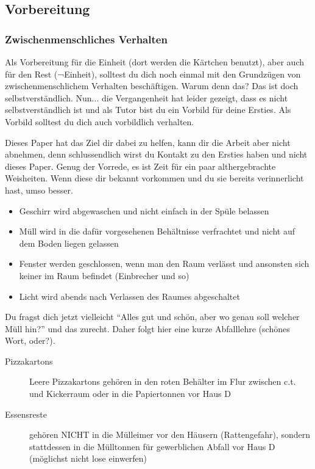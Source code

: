 \documentclass[a4paper,11pt]{scrartcl} %
\newenvironment{myitemize}{\begin{itemize}\itemsep -2pt}{\end{itemize}} %
\begin{document}
  \subsection{Vorbereitung} %
\subsubsection*{Zwischenmenschliches Verhalten}

Als Vorbereitung für die Einheit (dort werden die Kärtchen benutzt), aber auch für den Rest (¬Einheit), solltest du dich noch einmal mit den Grundzügen von zwischenmenschlichem Verhalten beschäftigen. Warum denn das? Das ist doch selbstverständlich.
Nun... die Vergangenheit hat leider gezeigt, dass es nicht selbstverständlich ist und als Tutor bist du ein Vorbild für deine Ersties. Als Vorbild solltest du dich auch vorbildlich verhalten.

Dieses Paper hat das Ziel dir dabei zu helfen, kann dir die Arbeit aber nicht abnehmen, denn schlussendlich wirst du Kontakt zu den Ersties haben und nicht dieses Paper. Genug der Vorrede, es ist Zeit für ein paar althergebrachte Weisheiten. Wenn diese dir bekannt vorkommen und du sie bereits verinnerlicht hast, umso besser.

\begin{myitemize}
	\item Geschirr wird abgewaschen und nicht einfach in der Spüle belassen
	\item Müll wird in die dafür vorgesehenen Behältnisse verfrachtet und nicht auf dem Boden liegen gelassen
	\item Fenster werden geschlossen, wenn man den Raum verlässt und ansonsten sich keiner im Raum befindet (Einbrecher und so)
	\item Licht wird abends nach Verlassen des Raumes abgeschaltet
\end{myitemize}

Du fragst dich jetzt vielleicht "`Alles gut und schön, aber wo genau soll welcher Müll hin?"' und das zurecht. Daher folgt hier eine kurze Abfalllehre (schönes Wort, oder?).

\begin{description}
	\item[Pizzakartons] Leere Pizzakartons gehören in den roten Behälter im Flur zwischen c.t. und Kickerraum oder in die Papiertonnen vor Haus D
	\item[Essensreste] gehören NICHT in die Mülleimer vor den Häusern (Rattengefahr), sondern stattdessen in die Mülltonnen für gewerblichen Abfall vor Haus D (möglichst nicht lose einwerfen)
\end{description}
\end{document}
